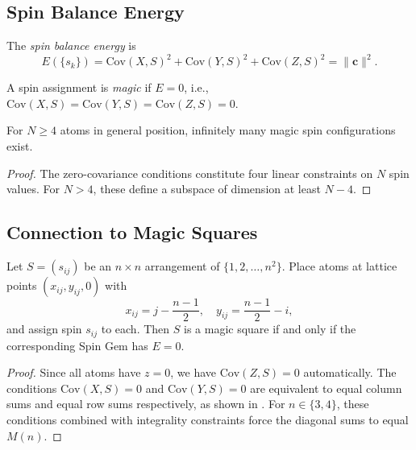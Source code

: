 \subsection{Spin Balance Energy}
\label{sec:energy}

\begin{definition}
\label{def:energy}
The \emph{spin balance energy} is
\begin{equation}
E(\{s_k\}) = \text{Cov}(X, S)^2 + \text{Cov}(Y, S)^2 + \text{Cov}(Z, S)^2 = \|\mathbf{c}\|^2.
\end{equation}
\end{definition}

\begin{definition}
A spin assignment is \emph{magic} if $E = 0$, i.e., $\text{Cov}(X, S) = \text{Cov}(Y, S) = \text{Cov}(Z, S) = 0$.
\end{definition}

\begin{proposition}[Existence]
\label{prop:existence}
For $N \geq 4$ atoms in general position, infinitely many magic spin configurations exist.
\end{proposition}

\begin{proof}
The zero-covariance conditions constitute four linear constraints on $N$ spin values. For $N > 4$, these define a subspace of dimension at least $N - 4$.
\end{proof}

\subsection{Connection to Magic Squares}
\label{sec:connection}

\begin{theorem}
\label{thm:connection}
Let $S = (s_{ij})$ be an $n \times n$ arrangement of $\{1, 2, \ldots, n^2\}$. Place atoms at lattice points $(x_{ij}, y_{ij}, 0)$ with
\[
x_{ij} = j - \frac{n-1}{2}, \quad y_{ij} = \frac{n-1}{2} - i,
\]
and assign spin $s_{ij}$ to each. Then $S$ is a magic square if and only if the corresponding Spin Gem has $E = 0$.
\end{theorem}

\begin{proof}
Since all atoms have $z = 0$, we have $\text{Cov}(Z, S) = 0$ automatically. The conditions $\text{Cov}(X, S) = 0$ and $\text{Cov}(Y, S) = 0$ are equivalent to equal column sums and equal row sums respectively, as shown in \cite{magic_gems_2025}. For $n \in \{3, 4\}$, these conditions combined with integrality constraints force the diagonal sums to equal $M(n)$.
\end{proof}

